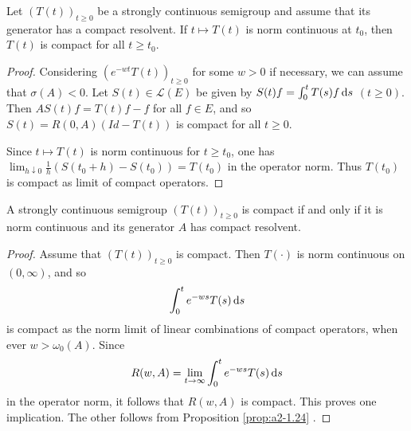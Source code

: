 \begin{proposition}\label{prop:a2-1.24}
Let $(T(t))_{t\geq 0}$ be a strongly continuous semigroup and assume that its generator has a compact resolvent.
If $t \mapsto T(t)$ is norm continuous at $t_0$, then $T(t)$ is compact for all $t \geq t_0$.
\end{proposition}
\begin{proof}
Considering $(e^{-wt}T(t))_{t\geq 0}$ for some $w > 0$ if necessary, we can assume that $\sigma(A) < 0$.
Let $S(t) \in \mathcal{L}(E)$ be given by 
$S(t)f = \int_0^t T(s)f \mathop{}\!\mathrm{d}{s}$ $(t \geq 0)$.
Then $AS(t)f = T(t)f - f$ for all $f \in E$, and so $S(t) = R(0,A)(Id-T(t))$ is compact for all $t \geq 0$.

Since $t \mapsto T(t)$ is norm continuous for $t \geq t_0$, one has 
$\lim_{h \downarrow 0} \frac{1}{h}(S(t_0+h)-S(t_0)) = T(t_0)$ in the operator norm.
Thus $T(t_0)$ is compact as limit of compact operators.
\end{proof}
\begin{theorem}\label{thm:a2-1.25}
A strongly continuous semigroup $(T(t))_{t\geq 0}$ is compact if and only if it is norm continuous and its generator $A$ has compact resolvent.
\end{theorem}
\begin{proof}
Assume that $(T(t))_{t\geq 0}$ is compact. Then $T(\cdot)$ is norm continuous on $(0,\infty)$, and so 
\[
    \int_{0}^{t} e^{-ws} T(s) \mathop{}\!\mathrm{d}{s}
\]
is compact as the norm limit of linear combinations of compact operators, when ever $w > \omega_{0}(A)$.
Since 
\[
    R(w,A) = \lim_{t \to \infty} \int_{0}^{t} e^{-ws} T(s) \mathop{}\!\mathrm{d}{s}
\]
in the operator norm, it follows that $R(w,A)$ is compact.
This proves one implication.
The other follows from Proposition \ref{prop:a2-1.24} . 
\end{proof}
